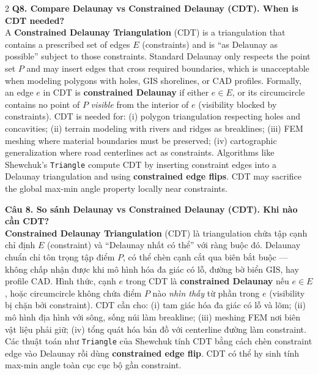 \begin{paracol}{2}
\textbf{Q8. Compare Delaunay vs Constrained Delaunay (CDT). When is CDT needed?}\\
A \textbf{Constrained Delaunay Triangulation} (CDT) is a triangulation that contains a prescribed set of edges $E$ (constraints) and is ``as Delaunay as possible'' subject to those constraints. Standard Delaunay only respects the point set $P$ and may insert edges that cross required boundaries, which is unacceptable when modeling polygons with holes, GIS shorelines, or CAD profiles. Formally, an edge $e$ in CDT is \textbf{constrained Delaunay} if either $e \in E$, or its circumcircle contains no point of $P$ \emph{visible} from the interior of $e$ (visibility blocked by constraints). CDT is needed for: (i) polygon triangulation respecting holes and concavities; (ii) terrain modeling with rivers and ridges as breaklines; (iii) FEM meshing where material boundaries must be preserved; (iv) cartographic generalization where road centerlines act as constraints. Algorithms like Shewchuk's \texttt{Triangle} compute CDT by inserting constraint edges into a Delaunay triangulation and using \textbf{constrained edge flips}. CDT may sacrifice the global max-min angle property locally near constraints.

\switchcolumn

\textbf{Câu 8. So sánh Delaunay vs Constrained Delaunay (CDT). Khi nào cần CDT?}\\
\textbf{Constrained Delaunay Triangulation} (CDT) là triangulation chứa tập cạnh chỉ định $E$ (constraint) và ``Delaunay nhất có thể'' với ràng buộc đó. Delaunay chuẩn chỉ tôn trọng tập điểm $P$, có thể chèn cạnh cắt qua biên bắt buộc — không chấp nhận được khi mô hình hóa đa giác có lỗ, đường bờ biển GIS, hay profile CAD. Hình thức, cạnh $e$ trong CDT là \textbf{constrained Delaunay} nếu $e \in E$, hoặc circumcircle không chứa điểm $P$ nào \emph{nhìn thấy} từ phần trong $e$ (visibility bị chặn bởi constraint). CDT cần cho: (i) tam giác hóa đa giác có lỗ và lõm; (ii) mô hình địa hình với sông, sống núi làm breakline; (iii) meshing FEM nơi biên vật liệu phải giữ; (iv) tổng quát hóa bản đồ với centerline đường làm constraint. Các thuật toán như \texttt{Triangle} của Shewchuk tính CDT bằng cách chèn constraint edge vào Delaunay rồi dùng \textbf{constrained edge flip}. CDT có thể hy sinh tính max-min angle toàn cục cục bộ gần constraint.

\switchcolumn*


\end{paracol}
